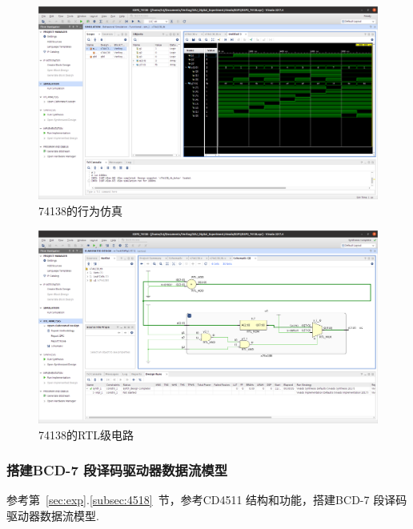 \documentclass[11pt]{SEU-Digital-Report}
\begin{document}
            \begin{figure}[htbp]
                \includegraphics[width=\linewidth]{fig/vivado/2_simu.png}
                \caption{74138的行为仿真}
                \label{fig:vivado_2_simu}
            \end{figure}

            \begin{figure}[htbp]
                \includegraphics[width=\linewidth]{fig/vivado/2_RTL.png}
                \caption{74138的RTL级电路}
                \label{fig:vivado_2_RTL}
            \end{figure}

            \newpage
            \subsubsection{搭建BCD-7 段译码驱动器数据流模型}

                参考第~\ref{sec:exp}.\ref{subsec:4518}~节，参考CD4511 结构和功能，搭建BCD-7 段译码驱动器数据流模型.
\end{document}
